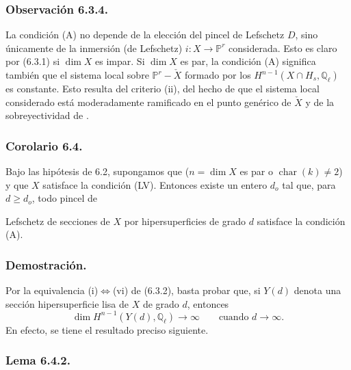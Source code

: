 \pageoriginale

\subsubsection*{Observación 6.3.4.}

La condición (A) no depende de la elección del pincel de Lefschetz
$D$, sino únicamente de la inmersión (de Lefschetz)
$i:X\longrightarrow\mathbb P^r$ considerada. Esto es claro por (6.3.1)
si $\dim X$ es impar. Si $\dim X$ es par, la condición (A) significa
también que el sistema local sobre $\mathbb P^r-\check X$ formado por
los $H^{n-1}(X\cap H_s,\mathbb Q_\ell)$ es constante. Esto resulta del
criterio (ii), del hecho de que el sistema local considerado está
moderadamente ramificado en el punto genérico de $\check X$ y de la
sobreyectividad de .

\subsubsection*{Corolario 6.4.}

Bajo las hipótesis de 6.2, supongamos
{que ($n=\dim X$ es par o $\operatorname{char}(k)\ne2$) y que $X$
satisface la condición (LV)}.
Entonces existe un entero $d_o$ tal que, para $d\ge d_o$, todo pincel de

\pageoriginale

Lefschetz de secciones de $X$ por hipersuperficies de grado $d$
satisface la condición (A).

\subsubsection*{Demostración.}

Por la equivalencia (i)$\Longleftrightarrow$(vi) de (6.3.2), basta
probar que, si $Y(d)$ denota una sección hipersuperficie lisa de $X$ de
grado $d$, entonces
\begin{equation}\tag{6.4.1}
\dim H^{n-1}(Y(d),\mathbb Q_\ell)\longrightarrow\infty
\qquad\text{cuando }d\longrightarrow\infty.
\end{equation}
En efecto, se tiene el resultado preciso siguiente.

\subsubsection*{Lema 6.4.2.}

